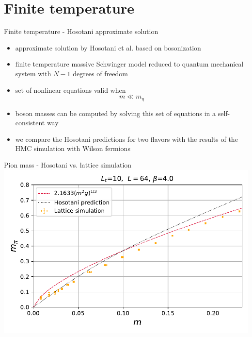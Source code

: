 \documentclass[english]{beamer}
\begin{document}
  
\section{Finite temperature}

\begin{frame}{Finite temperature - Hosotani approximate solution}
  \begin{itemize}
    \item approximate solution by Hosotani et al.
      based on bosonization
    \item finite temperature massive Schwinger model reduced to
      quantum mechanical system with $N - 1$ degrees of freedom
    \item set of nonlinear equations valid when
      \[
        m \ll m_\eta
      \]
    \item boson masses can be computed by solving this set of 
      equations in a self-consistent way
    \item we compare the Hosotani predictions for two flavors
      with the results of the HMC simulation with Wilson fermions
  \end{itemize}
\end{frame}

\begin{frame}{Pion mass - Hosotani vs. lattice simulation}
  \includegraphics[width=1\textwidth]{figs/MPi64x10vsMFiniteT_Pt2}
\end{frame}
\end{document}
